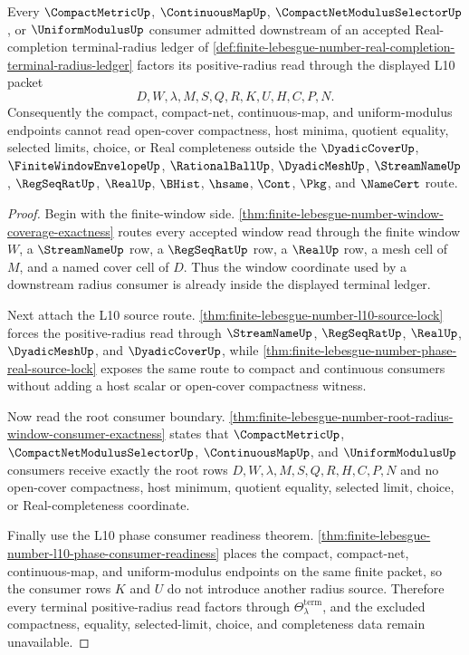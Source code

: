 \begin{theorem}
\label{thm:finite-lebesgue-number-real-completion-terminal-radius-exhaustion}
Every $\CompactMetricUp$, $\ContinuousMapUp$, $\CompactNetModulusSelectorUp$, or $\UniformModulusUp$ consumer admitted downstream of an accepted Real-completion terminal-radius ledger of \autoref{def:finite-lebesgue-number-real-completion-terminal-radius-ledger} factors its positive-radius read through the displayed L10 packet
$$
D,W,\lambda,M,S,Q,R,K,U,H,C,P,N .
$$
Consequently the compact, compact-net, continuous-map, and uniform-modulus endpoints cannot read open-cover compactness, host minima, quotient equality, selected limits, choice, or Real completeness outside the $\DyadicCoverUp$, $\FiniteWindowEnvelopeUp$, $\RationalBallUp$, $\DyadicMeshUp$, $\StreamNameUp$, $\RegSeqRatUp$, $\RealUp$, $\BHist$, $\hsame$, $\Cont$, $\Pkg$, and $\NameCert$ route.
\end{theorem}
\begin{proof}
Begin with the finite-window side. \autoref{thm:finite-lebesgue-number-window-coverage-exactness} routes every accepted window read through the finite window $W$, a $\StreamNameUp$ row, a $\RegSeqRatUp$ row, a $\RealUp$ row, a mesh cell of $M$, and a named cover cell of $D$. Thus the window coordinate used by a downstream radius consumer is already inside the displayed terminal ledger.

Next attach the L10 source route. \autoref{thm:finite-lebesgue-number-l10-source-lock} forces the positive-radius read through $\StreamNameUp$, $\RegSeqRatUp$, $\RealUp$, $\DyadicMeshUp$, and $\DyadicCoverUp$, while \autoref{thm:finite-lebesgue-number-phase-real-source-lock} exposes the same route to compact and continuous consumers without adding a host scalar or open-cover compactness witness.

Now read the root consumer boundary. \autoref{thm:finite-lebesgue-number-root-radius-window-consumer-exactness} states that $\CompactMetricUp$, $\CompactNetModulusSelectorUp$, $\ContinuousMapUp$, and $\UniformModulusUp$ consumers receive exactly the root rows $D,W,\lambda,M,S,Q,R,H,C,P,N$ and no open-cover compactness, host minimum, quotient equality, selected limit, choice, or Real-completeness coordinate.

Finally use the L10 phase consumer readiness theorem. \autoref{thm:finite-lebesgue-number-l10-phase-consumer-readiness} places the compact, compact-net, continuous-map, and uniform-modulus endpoints on the same finite packet, so the consumer rows $K$ and $U$ do not introduce another radius source. Therefore every terminal positive-radius read factors through $\Theta_{\lambda}^{\mathrm{term}}$, and the excluded compactness, equality, selected-limit, choice, and completeness data remain unavailable.
\end{proof}

